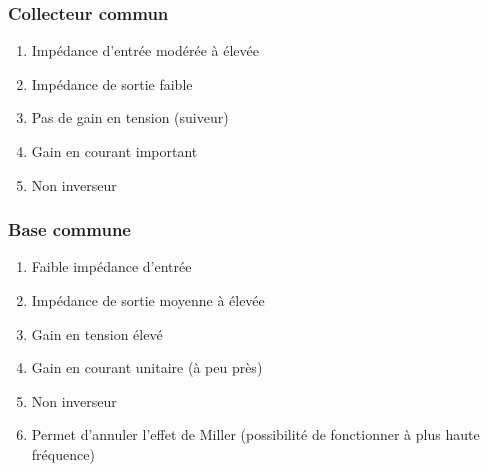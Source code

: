 \documentclass[resume]{subfiles}
\begin{document}
\begin{multicols}{3}
\subsubsection{Collecteur commun}
\begin{enumerate}
\item Impédance d'entrée modérée à élevée
\item Impédance de sortie faible
\item Pas de gain en tension (suiveur)
\item Gain en courant important
\item Non inverseur
\end{enumerate}
\subsubsection{Base commune}
\begin{enumerate}
\item Faible impédance d'entrée
\item Impédance de sortie moyenne à élevée
\item Gain en tension élevé
\item Gain en courant unitaire (à peu près)
\item Non inverseur
\item Permet d'annuler l'effet de Miller (possibilité de fonctionner à plus haute fréquence)
\end{enumerate}

\end{multicols}
\end{document}
